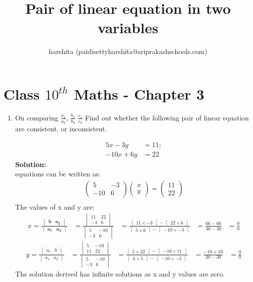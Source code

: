 \documentclass[12pt]{article}
\title{Pair of linear equation in two variables}
\author{harshita (paidisettyharshita@sriprakashschools.com)}
\newcommand{\myvec}[1]{\ensuremath{\begin{pmatrix}#1\end{pmatrix}}}
\newcommand{\mydet}[1]{\ensuremath{\begin{vmatrix}#1\end{vmatrix}}}
\newcommand{\solution}{\noindent \textbf{Solution: }}
\let\vec\mathbf
\begin{document}
\maketitle
\section*{Class $10^{th}$ Maths - Chapter 3}

\begin{enumerate}
 \item On comparing $\frac{a_1}{a_2}$, $\frac{b_1}{b_2}$ $\frac{c_1}{c_2} $
Find out whether the following pair of linear equation are consistent, or inconsistent.

\begin{align}
5x-3y&=11;\\
-10x+6y&=22
\end{align}
 \solution \\
 equations can be written as:\\

\begin{align}
\myvec{5&-3\\-10&6} \myvec{x\\y} = \myvec{11\\22}\\
\end{align}
The values of x and y are:
\begin{align}
x=\frac{\mydet{\vec{b} & \vec{a_2}}}{\mydet {\vec{a_1} &\vec{a_2}}} &=
\frac{\mydet{11&22 \\ -3&6}}{\mydet {5&-10 \\ -3&6}}&=\frac{\mydet{11\times-3}-\mydet{22\times6}}{\mydet{5\times6}-\mydet{-10\times-3}}
&=\frac{66-66}{30-30}&=\frac{0}{0}
\end{align}
\begin{align}
 y=\frac{\mydet{ a_1 & b}}{\mydet {a_1 & a_2}}&=
\frac{\mydet{5&-10\\11&22}}{\mydet{5&-10\\-3&6}}&=\frac{\mydet{5\times22}-\mydet{-10\times11}}{\mydet{6\times5}-\mydet{-10\times-3}}
&=\frac{-10+10}{30-30}&=\frac{0}{0}
\end{align}
The solution derived has infinite solutions as x and y values are zero.

\end{enumerate}
\end{document}

